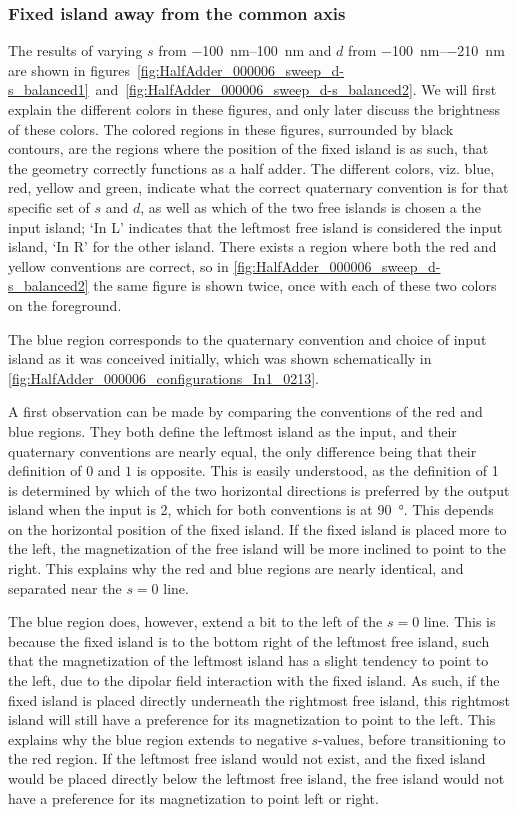 \documentclass[11pt,a4paper,english]{article}
\begin{document}
\subsubsection{Fixed island away from the common axis}
The results of varying $s$ from \SIrange{-100}{100}{\nano\metre} and $d$ from \SIrange{-100}{-210}{\nano\metre} are shown in figures~\ref{fig:HalfAdder_000006_sweep_d-s_balanced1}~and~\ref{fig:HalfAdder_000006_sweep_d-s_balanced2}. We will first explain the different colors in these figures, and only later discuss the brightness of these colors. The colored regions in these figures, surrounded by black contours, are the regions where the position of the fixed island is as such, that the geometry correctly functions as a half adder. The different colors, viz. blue, red, yellow and green, indicate what the correct quaternary convention is for that specific set of $s$ and $d$, as well as which of the two free islands is chosen a the input island; `In L' indicates that the leftmost free island is considered the input island, `In R' for the other island. There exists a region where both the red and yellow conventions are correct, so in \cref{fig:HalfAdder_000006_sweep_d-s_balanced2} the same figure is shown twice, once with each of these two colors on the foreground. \par
The blue region corresponds to the quaternary convention and choice of input island as it was conceived initially, which was shown schematically in \cref{fig:HalfAdder_000006_configurations_In1_0213}. \par
A first observation can be made by comparing the conventions of the red and blue regions. They both define the leftmost island as the input, and their quaternary conventions are nearly equal, the only difference being that their definition of $0$ and $1$ is opposite. This is easily understood, as the definition of 1 is determined by which of the two horizontal directions is preferred by the output island when the input is 2, which for both conventions is at \SI{90}{\degree}. This depends on the horizontal position of the fixed island. If the fixed island is placed more to the left, the magnetization of the free island will be more inclined to point to the right. This explains why the red and blue regions are nearly identical, and separated near the $s=0$ line. \par
The blue region does, however, extend a bit to the left of the $s=0$ line. This is because the fixed island is to the bottom right of the leftmost free island, such that the magnetization of the leftmost island has a slight tendency to point to the left, due to the dipolar field interaction with the fixed island. As such, if the fixed island is placed directly underneath the rightmost free island, this rightmost island will still have a preference for its magnetization to point to the left. This explains why the blue region extends to negative $s$-values, before transitioning to the red region. If the leftmost free island would not exist, and the fixed island would be placed directly below the leftmost free island, the free island would not have a preference for its magnetization to point left or right. \par
\end{document}
